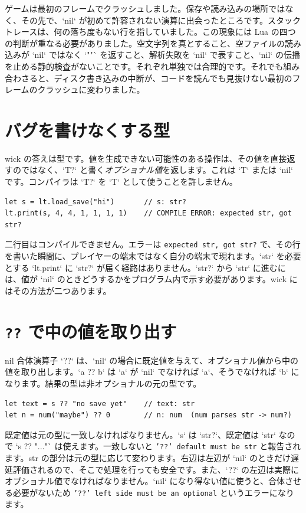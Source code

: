 \noindent
ゲームは最初のフレームでクラッシュしました。保存や読み込みの場所ではなく、その先で、`nil` が初めて許容されない演算に出会ったところです。スタックトレースは、何の落ち度もない行を指していました。この現象には Lua の四つの判断が重なる必要がありました。空文字列を真とすること、空ファイルの読み込みが `nil` ではなく `""` を返すこと、解析失敗を `nil` で表すこと、`nil` の伝播を止める静的検査がないことです。それぞれ単独では合理的です。それでも組み合わさると、ディスク書き込みの中断が、コードを読んでも見抜けない最初のフレームのクラッシュに変わりました。

\section{バグを書けなくする型}

wick の答えは型です。値を生成できない可能性のある操作は、その値を直接返すのではなく、`T?` と書く\emph{オプショナル値}を返します。これは `T` または `nil` です。コンパイラは `T?` を `T` として使うことを許しません。

\begin{lstlisting}[language=wick]
let s = lt.load_save("hi")       // s: str?
lt.print(s, 4, 4, 1, 1, 1, 1)    // COMPILE ERROR: expected str, got str?
\end{lstlisting}

\noindent
二行目はコンパイルできません。エラーは \texttt{expected str, got str?} で、その行を書いた瞬間に、プレイヤーの端末ではなく自分の端末で現れます。`str` を必要とする `lt.print` に `str?` が届く経路はありません。`str?` から `str` に進むには、値が `nil` のときどうするかをプログラム内で示す必要があります。wick にはその方法が二つあります。

\section{\texttt{??} で中の値を取り出す}

nil 合体演算子 `??` は、`nil` の場合に既定値を与えて、オプショナル値から中の値を取り出します。`a ?? b` は `a` が `nil` でなければ `a`、そうでなければ `b` になります。結果の型は非オプショナルの元の型です。

\begin{lstlisting}[language=wick]
let text = s ?? "no save yet"    // text: str
let n = num("maybe") ?? 0        // n: num  (num parses str -> num?)
\end{lstlisting}

\noindent
既定値は元の型に一致しなければなりません。`s` は `str?`、既定値は `str` なので `s ?? "..."` は使えます。一致しないと \texttt{'??' default must be str} と報告されます。str の部分は元の型に応じて変わります。右辺は左辺が `nil` のときだけ遅延評価されるので、そこで処理を行っても安全です。また、`??` の左辺は実際にオプショナル値でなければなりません。`nil` になり得ない値に使うと、合体させる必要がないため \texttt{'??' left side must be an optional} というエラーになります。


